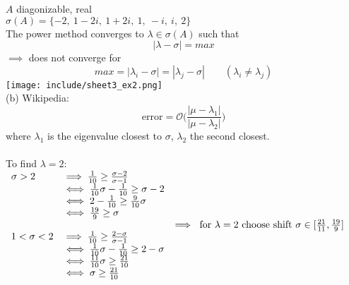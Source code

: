 \begin{SolutionSheet}[\ref{sheet3}]
\begin{onehalfspace}
  \begin{Solution}
    $A$ diagonizable, real \\
    $\sigma(A) = \{-2, \ 1-2i, \ 1+2i, \ 1, \ -i, \ i, \ 2\}$ \\
    The power method converges to $\lambda\in \sigma(A)$ such that \begin{equation*}
      |\lambda - \sigma| = max
    \end{equation*} 
    $\implies $ does not converge for \begin{equation*}
      max = |\lambda_i -\sigma| = |\lambda_j - \sigma| \qquad (\lambda_i \neq \lambda_j)
    \end{equation*} 
    \texttt{[image: include/sheet3\_ex2.png]}\\
    (b) Wikipedia: \begin{equation*}
      \text{error} = \mathcal{O}\big(\frac{|\mu -\lambda_1|}{|\mu -\lambda_2|}\big) 
    \end{equation*}
    where $\lambda_1$ is the eigenvalue closest to $\sigma$, $\lambda_2$ the second closest.\\
    \\
    To find $\lambda = 2$:\\
    $\begin{array}{ll}
      \sigma > 2 &\implies \frac{1}{10} \geq \frac{\sigma - 2}{\sigma - 1}\\
        &\iff \frac{1}{10}\sigma - \frac{1}{10} \geq \sigma - 2 \\
        &\iff 2-\frac{1}{10} \geq \frac{9}{10}\sigma \\
        &\iff \frac{19}{9} \geq \sigma \\
        \\
      1 < \sigma < 2 &\implies \frac{1}{10} \geq \frac{2-\sigma}{\sigma -1} \\
       &\iff \frac{1}{10}\sigma - \frac{1}{10} \geq 2-\sigma \\
       &\iff \frac{11}{10}\sigma \geq \frac{21}{10} \\
       &\iff \sigma \geq \frac{21}{10}
    \end{array}\\
    \implies \text{ for }  \lambda=2  \text{ choose shift } \sigma\in  [\frac{21}{11}, \frac{19}{9}] $
  \end{Solution}


\end{onehalfspace}
\end{SolutionSheet}
